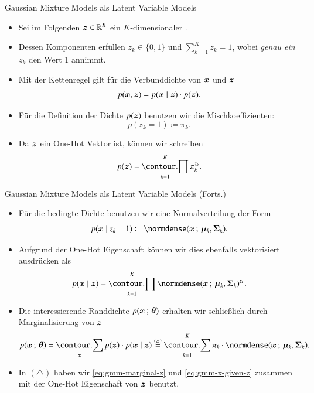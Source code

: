 \begin{frame}{Gaussian Mixture Models als Latent Variable Models}{}
	\begin{itemize}
		\item Sei im Folgenden $\bm{z} \in \mathbb{R}^K$ ein $K$-dimensionaler .
		\item Dessen Komponenten erfüllen $z_k \in \{ 0, 1 \}$ und $\sum_{k=1}^K z_k = 1$,
			wobei \textit{genau ein} $z_k$ den Wert 1 annimmt.
		\item Mit der Kettenregel gilt für die Verbunddichte von $\bm{x}$ und $\bm{z}$
		\begin{equation*}
			p(\bm{x}, \bm{z}) = p(\bm{x} \mid \bm{z}) \cdot p(\bm{z}).
		\end{equation*}
		\item Für die Definition der Dichte $p(\bm{z})$ benutzen wir die Mischkoeffizienten: $$p(z_k = 1) \coloneqq \pi_k.$$
		\item Da $\bm{z}$ ein One-Hot Vektor ist, können wir schreiben
		\begin{equation} \label{eq:gmm-marginal-z}
			p(\bz) = \prod_{k=1}^K \pi_k^{z_k}.
		\end{equation}
	\end{itemize}
\end{frame}


\begin{frame}{Gaussian Mixture Models als Latent Variable Models (Forts.)}{}
	\begin{itemize}
		\item Für die bedingte Dichte benutzen wir eine Normalverteilung der Form
		\begin{equation*}
			p(\bx \mid z_k = 1) \coloneqq \normdense(\bx \param \bmu_k, \bSigma_k).
		\end{equation*}
		\item Aufgrund der One-Hot Eigenschaft können wir dies ebenfalls vektorisiert ausdrücken als
		\begin{equation} \label{eq:gmm-x-given-z}
			p(\bx \mid \bz) = \prod_{k=1}^K \normdense(\bx \param \bmu_k, \bSigma_k)^{z_k}.
		\end{equation}
		\item Die interessierende Randdichte $p(\bm{x} \,;\, \bm{\theta})$ erhalten wir schließlich durch Marginalisierung von $\bm{z}$
		\begin{equation}
			p(\bx \param \btheta)
				= \sum_{\bz} p(\bz) \cdot p(\bx \mid \bz)
				\overset{(\triangle)}{=} \sum_{k=1}^K \pi_k \cdot \normdense(\bx \param \bmu_k, \bSigma_k).
		\end{equation}
		\item In $(\triangle)$ haben wir \eqref{eq:gmm-marginal-z} und \eqref{eq:gmm-x-given-z}
			zusammen mit der One-Hot Eigenschaft von $\bm{z}$ benutzt.
	\end{itemize}
\end{frame}


